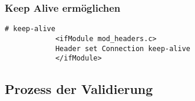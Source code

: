 
		\subsubsection{Keep Alive ermöglichen} %
		\label{ssub:keep_alive_ermöglichen}
		\begin{lstlisting}[captionpos=b, caption=keep alive, label=lst:keepAlive]
			# keep-alive
			<ifModule mod_headers.c> 
			Header set Connection keep-alive
			</ifModule>
		\end{lstlisting}
			


	\subsection{Prozess der Validierung}
	\label{sub:prozess_der_validierung}
	

	

